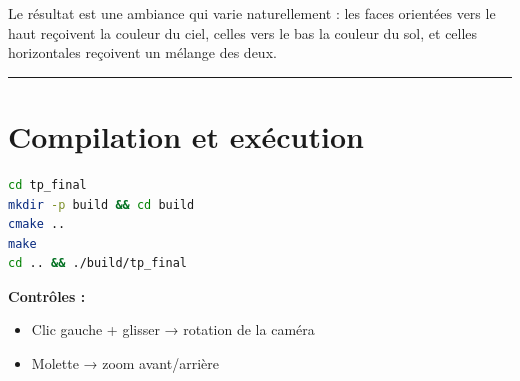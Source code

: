 \documentclass[11pt,a4paper]{article}
\begin{document}
Le résultat est une ambiance qui varie naturellement : les faces orientées vers le haut reçoivent la couleur du ciel, celles vers le bas la couleur du sol, et celles horizontales reçoivent un mélange des deux.

\vspace{1em}\hrule\vspace{1em}

\section{Compilation et exécution}

\begin{lstlisting}[language=bash]
cd tp_final
mkdir -p build && cd build
cmake ..
make
cd .. && ./build/tp_final
\end{lstlisting}

\textbf{Contrôles :}
\begin{itemize}
    \item Clic gauche + glisser → rotation de la caméra
    \item Molette → zoom avant/arrière
\end{itemize}
\end{document}
